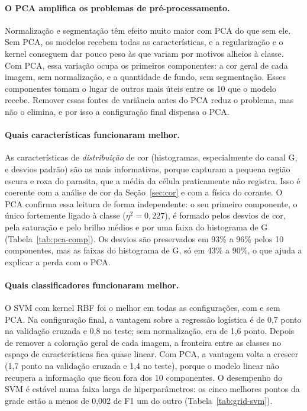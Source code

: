 \documentclass[11pt,a4paper]{article}
\begin{document}
\paragraph{O PCA amplifica os problemas de pré-processamento.} Normalização e segmentação têm efeito
muito maior com PCA do que sem ele. Sem PCA, os modelos recebem todas as características, e a
regularização e o kernel conseguem dar pouco peso às que variam por motivos alheios à classe. Com PCA,
essa variação ocupa os primeiros componentes: a cor geral de cada imagem, sem normalização, e a
quantidade de fundo, sem segmentação. Esses componentes tomam o lugar de outros mais úteis entre os
10 que o modelo recebe. Remover essas fontes de variância antes do PCA reduz o problema, mas não o
elimina, e por isso a configuração final dispensa o PCA.

\paragraph{Quais características funcionaram melhor.} As características de \emph{distribuição} de cor
(histogramas, especialmente do canal G, e desvios padrão) são as mais informativas, porque capturam a
pequena região escura e roxa do parasita, que a média da célula praticamente não registra. Isso é
coerente com a análise de cor da Seção~\ref{sec:cor} e com a física do corante. O PCA confirma essa
leitura de forma independente: o seu primeiro componente, o único fortemente ligado à classe
($\eta^2=0{,}227$), é formado pelos desvios de cor, pela saturação e pelo brilho médios e por uma faixa
do histograma de G (Tabela~\ref{tab:pca-comp}). Os desvios são preservados em 93\% a 96\% pelos 10
componentes, mas as faixas do histograma de G, só em 43\% a 90\%, o que ajuda a explicar a perda com
o PCA.

\paragraph{Quais classificadores funcionaram melhor.} O SVM com kernel RBF foi o melhor em todas as
configurações, com e sem PCA. Na configuração final, a vantagem sobre a regressão logística é de 0,7
ponto na validação cruzada e 0,8 no teste; sem normalização, era de 1,6 ponto. Depois de remover a
coloração geral de cada imagem, a fronteira entre as classes no espaço de características fica quase
linear. Com PCA, a vantagem volta a crescer (1,7 ponto na validação cruzada e 1,4 no teste), porque o
modelo linear não recupera a informação que ficou fora dos 10 componentes. O desempenho do SVM é
estável numa faixa larga de hiperparâmetros: os cinco melhores pontos da grade estão a menos de 0,002
de F1 um do outro (Tabela~\ref{tab:grid-svm}).
\end{document}
